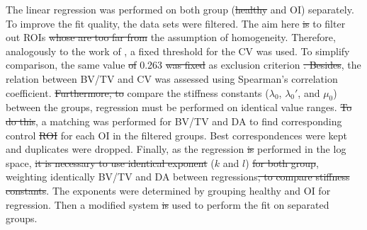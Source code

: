 \documentclass[a4paper,fleqn]{DC_ArtStyle}
\providecommand{\DIFadd}[1]{{\protect\color{blue}{#1}}} %
\providecommand{\DIFdel}[1]{{\protect\color{red}\sout{#1}}}                      %
\providecommand{\DIFaddbegin}{} %
\providecommand{\DIFaddend}{} %
\providecommand{\DIFdelbegin}{} %
\providecommand{\DIFdelend}{} %
\begin{document}
The linear regression was performed on both group (\DIFdelbegin \DIFdel{healthy }\DIFdelend \DIFaddbegin \DIFadd{heal\-thy }\DIFaddend and OI) separately. To improve the fit quality, the data sets were filtered. The aim here \DIFdelbegin \DIFdel{is }\DIFdelend \DIFaddbegin \DIFadd{was }\DIFaddend to filter out ROIs \DIFdelbegin \DIFdel{whose are too far from }\DIFdelend \DIFaddbegin \DIFadd{violating }\DIFaddend the assumption of homogeneity. Therefore, analogously to the work of \citeauthor{Panyasantisuk2015}\cite{Panyasantisuk2015}, a fixed threshold for the CV was used. To simplify comparison, \DIFaddbegin \DIFadd{we used }\DIFaddend the same value \DIFdelbegin \DIFdel{of }\DIFdelend 0.263 \DIFdelbegin \DIFdel{was fixed }\DIFdelend as exclusion criterion \DIFdelbegin \DIFdel{. Besides}\DIFdelend \DIFaddbegin \DIFadd{\mbox{%
\cite{Panyasantisuk2015}}\hspace{0pt}%
. Then}\DIFaddend , the relation between BV/TV and CV was assessed using Spearman's correlation coefficient. \DIFdelbegin \DIFdel{Furthermore, to }\DIFdelend \DIFaddbegin \DIFadd{To }\DIFaddend compare the stiffness constants ($\lambda_0$, $\lambda_0'$, and $\mu_0$) between the groups, regression must be performed on identical value ranges. \DIFdelbegin \DIFdel{To do this}\DIFdelend \DIFaddbegin \DIFadd{Therefore}\DIFaddend , a matching was performed for BV/TV and DA to find corresponding control \DIFdelbegin \DIFdel{ROI }\DIFdelend \DIFaddbegin \DIFadd{ROIs }\DIFaddend for each OI in the filtered groups. Best correspondences were kept and duplicates were dropped. Finally, as the regression \DIFdelbegin \DIFdel{is }\DIFdelend \DIFaddbegin \DIFadd{was }\DIFaddend performed in the log space, \DIFdelbegin \DIFdel{it is necessary to use identical exponent }\DIFdelend \DIFaddbegin \DIFadd{slight differences in the exponents }\DIFaddend ($k$ and $l$) \DIFdelbegin \DIFdel{for both group}\DIFdelend \DIFaddbegin \DIFadd{would lead to important variation of the stiffness constants ($\lambda_0$, $\lambda_0'$, and $\mu_0$) so it was necessary to use identical exponents  for both groups}\DIFaddend , weighting identically BV/TV and DA between regressions\DIFdelbegin \DIFdel{, to compare stiffness constants}\DIFdelend . The exponents were determined by grouping healthy and OI for regression. Then a modified system \DIFdelbegin \DIFdel{is }\DIFdelend \DIFaddbegin \DIFadd{was }\DIFaddend used to perform the fit on separated groups\DIFaddbegin \DIFadd{, see Appendix \ref{A1}, Equation \ref{EqA11}}\DIFaddend .\\
\end{document}
